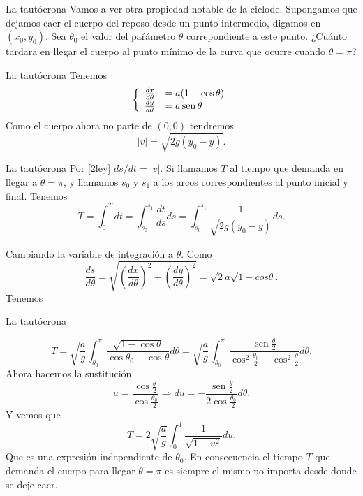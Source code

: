 \documentclass[handout,hyperref={colorlinks=true}]{beamer}
\DeclareMathOperator{\sen}{sen}
\newcommand{\nl}{\onslide<+-> }
\begin{document}
  \begin{frame}{La tautócrona}
  Vamos a ver otra propiedad notable de la ciclode. Supongamos que dejamos caer el cuerpo del reposo desde un punto intermedio, digamos en $(x_0,y_0)$. Sea  $\theta_0$
 el valor del paŕámetro $\theta$ correpondiente a este punto. ¿Cuánto tardara en llegar el cuerpo al punto mínimo de la curva que ocurre cuando $\theta=\pi$? 
\begin{center}
\end{center}

  \end{frame}
  
  
  \begin{frame}{La tautócrona}
\nl Tenemos
\[
 \left\{ \begin{array}{l l}
 \frac{dx}{d\theta}&=a(1-\cos\theta)\\
 \frac{dy}{d\theta}&=a\sen\theta 
 \end{array}\right.
\]
% 
Como el cuerpo ahora no parte de $(0,0)$ tendremos
\[|v|=\sqrt{2g(y_0-y)}.\]

  \end{frame}
  
  \begin{frame}{La tautócrona}
Por \eqref{2ley} $ds/dt=|v|$. Si llamamos $T$ al tiempo que demanda en llegar a $\theta=\pi$, y llamamos  $s_0$ y $s_1$ a los arcos correspondientes al punto inicial
y final.  Tenemos
 \[T=\int_0^Tdt=\int_{s_0}^{s_1}\frac{dt}{ds}ds=\int_{s_0}^{s_1}\frac{1}{\sqrt{2g(y_0-y)}}ds.\]
 
Cambiando la variable de integración a $\theta$. Como 
\[
 \frac{ds}{d\theta}=\sqrt{\left(\frac{dx}{d\theta}\right)^2+\left(\frac{dy}{d\theta}\right)^2}=\sqrt{2}a\sqrt{1-cos\theta}.
\]
 Tenemos

  \end{frame}
   \begin{frame}{La tautócrona}

\[T=\sqrt{\frac{a}{g}}\int_{\theta_0}^{\pi}\frac{\sqrt{1-\cos\theta}}{\cos\theta_0-\cos\theta}d\theta=
\sqrt{\frac{a}{g}}\int_{\theta_0}^{\pi}\frac{\sen\frac{\theta}{2}}{\cos^2\frac{\theta_0}{2}-\cos^2\frac{\theta}{2}}d\theta.
\]
Ahora hacemos la sustitución
\[u=\frac{\cos\frac{\theta}{2}}{\cos\frac{\theta_0}{2}}\Longrightarrow du=-\frac{\sen\frac{\theta}{2}}{2\cos\frac{\theta_0}{2}}d\theta.\]
Y vemos que
\[
 T=2\sqrt{\frac{a}{g}}\int_0^1\frac{1}{\sqrt{1-u^2}}du.
\]
Que es una expresión independiente de $\theta_0$. En consecuencia el tiempo $T$ que demanda  el cuerpo para llegar $\theta=\pi$ es siempre el mismo no importa
desde donde se deje caer.
  \end{frame} 
\end{document}
